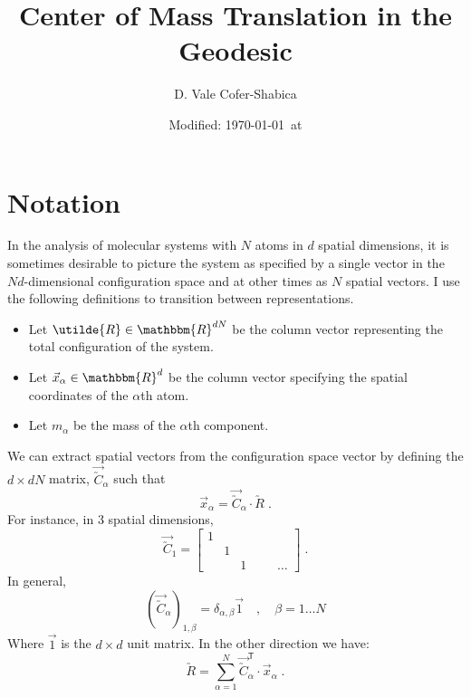 \documentclass[letterpaper,12pt]{article}
\title{Center of Mass Translation in the Geodesic}
\date{Modified: \today\ at \currenttime}
\author{D. Vale Cofer-Shabica}
\newcommand{\trans}[1]{{#1}^{\mathsf{T}}}
\newcommand{\scmat}[1]{\vec{\utilde{#1}}}
\newcommand{\cvec}[1]{\utilde{#1}}
\newcommand{\svec}[1]{\vec{#1}}
\newcommand{\laeq}[1]{\label{eqn:#1}}
\begin{document}
\maketitle


\section{Notation}
In the analysis of molecular systems with $N$ atoms in $d$ spatial dimensions, it is sometimes desirable to picture the system as specified by a single vector in the $Nd$-dimensional configuration space and at other times as $N$ spatial vectors. I use the following definitions to transition between representations. 

\begin{itemize}
\item Let $\cvec{R} \in \mathbbm{R}^{dN}$ be the column vector representing the total configuration of the system.
\item Let $\svec{x}_{\alpha} \in \mathbbm{R}^{d}$ be the column vector specifying the spatial coordinates of the $\alpha$th atom.
\item Let $m_{\alpha}$ be the mass of the $\alpha$th component.
\end{itemize}

We can extract spatial vectors from the configuration space vector by defining the $d \times dN$ matrix, $\scmat{C}_{\alpha}$ such that
\begin{equation}
\svec{x}_{\alpha} = \scmat{C}_{\alpha} \cdot \cvec{R} \; .
\end{equation}
For instance, in 3 spatial dimensions,
\[
\scmat{C}_{1}=
\begin{bmatrix}
1 &   &   & & &\\
  & 1 &   & & &\\
  &   & 1 & & &\ldots
\end{bmatrix} \; .
\]
In general,
\begin{equation}
\left(\scmat{C}_{\alpha} \right)_{1,\beta} = \delta_{\alpha,\beta} \svec{1} \quad , \quad \beta = 1 \ldots N
\end{equation}
Where $\svec{1}$ is the $d \times d$ unit matrix.
In the other direction we have:
\begin{equation}\laeq{constructR}
\cvec{R} = \sum_{\alpha = 1}^{N} \trans{\scmat{C}}_{\alpha} \cdot \svec{x}_{\alpha} \; .
\end{equation}
\end{document}
